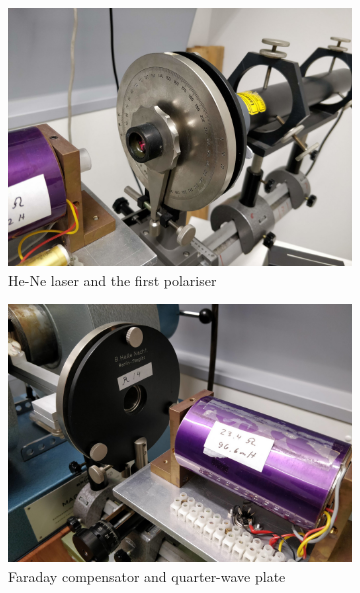 \documentclass[11pt,a4paper]{article}
\begin{document}
\begin{figure}[H]
\centering
\begin{subfigure}[b]{0.45\textwidth}
\includegraphics[width=\textwidth]{laser_polariser}
\caption{He-Ne laser and the first polariser}
\label{fig:exp_setup_laser}
\end{subfigure}
\begin{subfigure}[b]{0.45\textwidth}
\includegraphics[width=\textwidth]{Faraday_compensator_quarter_plate}
\caption{Faraday compensator and quarter-wave plate}
\label{fig:exp_setup_faraday}
\end{subfigure}\\\vspace{.2cm}
\begin{subfigure}[b]{0.45\textwidth}

\end{subfigure}
\end{figure}
\end{document}
